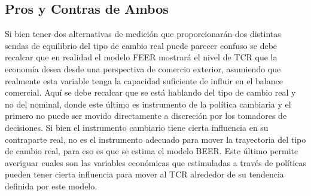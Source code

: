 \documentclass[12pt,letterpaper]{article}
\begin{document}

\subsection{Pros y Contras de Ambos}

Si bien tener dos alternativas de medición que proporcionarán dos distintas sendas de equilibrio del tipo de cambio real puede parecer confuso se debe recalcar que en realidad el modelo FEER mostrará el nivel de TCR que la economía desea desde una perspectiva de comercio exterior, asumiendo que realmente esta variable tenga la capacidad suficiente de influir en el balance comercial. Aquí se debe recalcar que se está hablando del tipo de cambio real y no del nominal, donde este último es instrumento de la política cambiaria y el primero no puede ser movido directamente a discreción por los tomadores de decisiones. Si bien el instrumento cambiario tiene cierta influencia en su contraparte real, no es el instrumento adecuado para mover la trayectoria del tipo de cambio real, para eso es que se estima el modelo BEER. Este último permite averiguar cuales son las variables económicas que estimuladas a través de políticas pueden tener cierta influencia para mover al TCR alrededor de su tendencia definida por este modelo.
\end{document}
